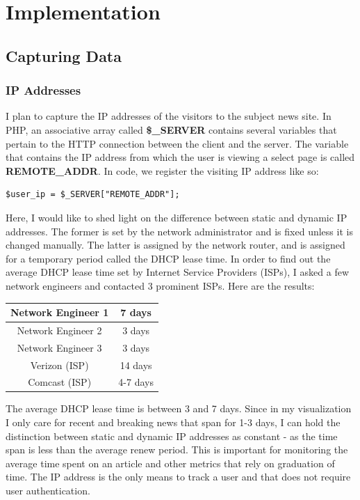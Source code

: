 \documentclass[12pt]{article}
\begin{document}
\vfill

\section{Implementation}
\subsection{Capturing Data}
\subsubsection{IP Addresses}
I plan to capture the IP addresses of the visitors to the subject news site. In PHP, an associative array called \textbf{\$\_SERVER}  contains several variables that pertain to the HTTP connection between the client and the server. The variable that contains the IP address from which the user is viewing a select page is called \textbf{REMOTE\_ADDR}. In code, we register the visiting IP address like so:
\begin{lstlisting}
$user_ip = $_SERVER["REMOTE_ADDR"];
\end{lstlisting}

Here, I would like to shed light on the difference between static and dynamic IP addresses. The former is set by the network administrator and is fixed unless it is changed manually. The latter is assigned by the network router, and is assigned for a temporary period called the DHCP lease time. In order to find out the average DHCP lease time set by Internet Service Providers (ISPs), I asked a few network engineers and contacted 3 prominent ISPs. Here are the results:
\vspace{0.3in}

\begin{tabular}{| c | c |}
  \hline                       
  Network Engineer 1 & 7 days \\[1ex] \hline
  Network Engineer 2 & 3 days \\[1ex] \hline
  Network Engineer 3 & 3 days \\ [1ex] \hline
  Verizon (ISP) & 14 days \\[1ex] \hline
  Comcast (ISP) & 4-7 days \\[1ex]
  \hline  
\end{tabular}
\vspace{0.3in}

The average DHCP lease time is between 3 and 7 days. Since in my visualization I only care for recent and breaking news that span for 1-3 days, I can hold the distinction between static and dynamic IP addresses as constant - as the time span is less than the average renew period. This is important for monitoring the average time spent on an article and other metrics that rely on graduation of time. The IP address is the only means to track a user and that does not require user authentication. 
\end{document}
